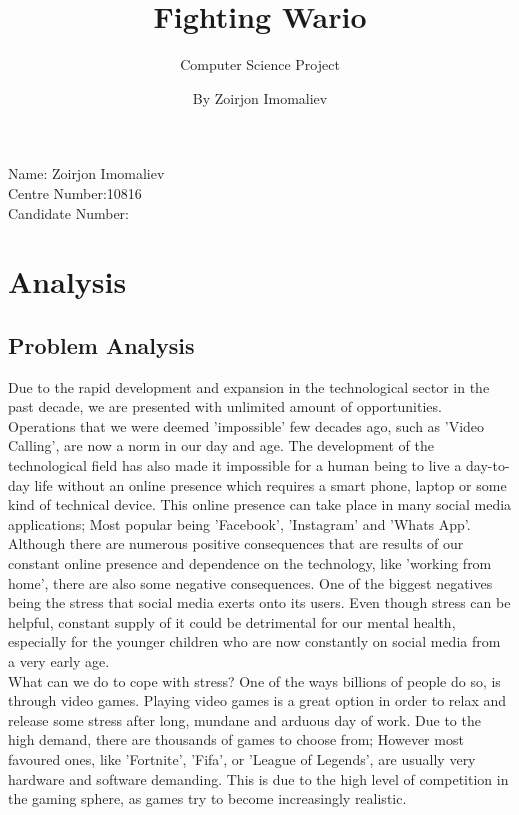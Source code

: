\documentclass[12pt]{article}
\title{Fighting Wario}
\author{Computer Science Project}
\date{By Zoirjon Imomaliev}
\begin{document}
\maketitle
\begin{center}
    Name: Zoirjon Imomaliev
    \\
    
    Centre Number:10816
    \\
    
    Candidate Number:
    \\
\end{center}
\newpage
\tableofcontents
\newpage

\section{Analysis}

\subsection{Problem Analysis}
Due to the rapid development and expansion in the technological sector in the past decade, we are presented with unlimited amount of opportunities. Operations that we were deemed 'impossible' few decades ago, such as 'Video Calling', are now a norm in our day and age. The development of the technological field has also made it impossible for a human being to live a day-to-day life without an online presence which requires a smart phone, laptop or some kind of technical device. This online presence can take place in many social media applications; Most popular being 'Facebook', 'Instagram' and 'Whats App'.
\\

Although there are numerous positive consequences that are results of our constant online presence and dependence on the technology, like 'working from home', there are also some negative consequences. One of the biggest negatives being the stress that social media exerts onto its users. Even though stress can be helpful, constant supply of it could be detrimental for our mental health, especially for the younger children who are now constantly on social media from a very early age.
\\

What can we do to cope with stress? One of the ways billions of people do so, is through video games. Playing video games is a great option in order to relax and release some stress after long, mundane and arduous day of work. Due to the high demand, there are thousands of games to choose from; However most favoured ones, like 'Fortnite', 'Fifa', or 'League of Legends',  are usually very hardware and software demanding. This is due to the high level of competition in the gaming sphere, as games try to become increasingly realistic. 
\\
\end{document}
